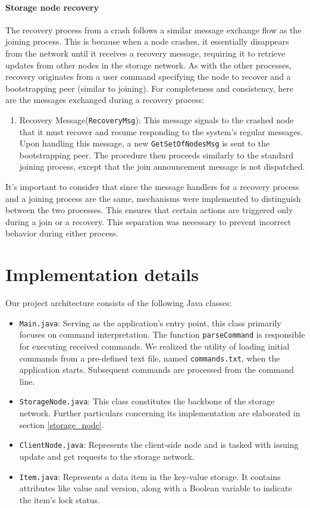 \documentclass[a4paper, 11pt]{article}
\begin{document}
\paragraph{Storage node recovery} The recovery process from a crash follows a similar message exchange flow as the joining process. This is because when a node crashes, it essentially disappears from the network until it receives a recovery message, requiring it to retrieve updates from other nodes in the storage network. As with the other processes, recovery originates from a user command specifying the node to recover and a bootstrapping peer (similar to joining). For completeness and consistency, here are the messages exchanged during a recovery process:

\begin{enumerate}
    \item Recovery Message(\verb|RecoveryMsg|): This message signals to the crashed node that it must recover and resume responding to the system's regular messages. Upon handling this message, a new \verb|GetSetOfNodesMsg| is sent to the bootstrapping peer. The procedure then proceeds similarly to the standard joining process, except that the join announcement message is not dispatched.
\end{enumerate}

It's important to consider that since the message handlers for a recovery process and a joining process are the same, mechanisms were implemented to distinguish between the two processes. This ensures that certain actions are triggered only during a join or a recovery. This separation was necessary to prevent incorrect behavior during either process.

\section{Implementation details}


Our project architecture consists of the following Java classes:
\begin{itemize}
    \item \verb|Main.java|: Serving as the application's entry point, this class primarily focuses on command interpretation. The function \verb|parseCommand| is responsible for executing received commands. We realized the utility of loading initial commands from a pre-defined text file, named \verb|commands.txt|, when the application starts. Subsequent commands are processed from the command line.
    \item \verb|StorageNode.java|: This class constitutes the backbone of the storage network. Further particulars concerning its implementation are elaborated in section \ref{storage_node}.
    \item \verb|ClientNode.java|: Represents the client-side node and is tasked with issuing update and get requests to the storage network.
    \item \verb|Item.java|: Represents a data item in the key-value storage. It contains attributes like value and version, along with a Boolean variable to indicate the item's lock status.
\end{itemize}
\end{document}

